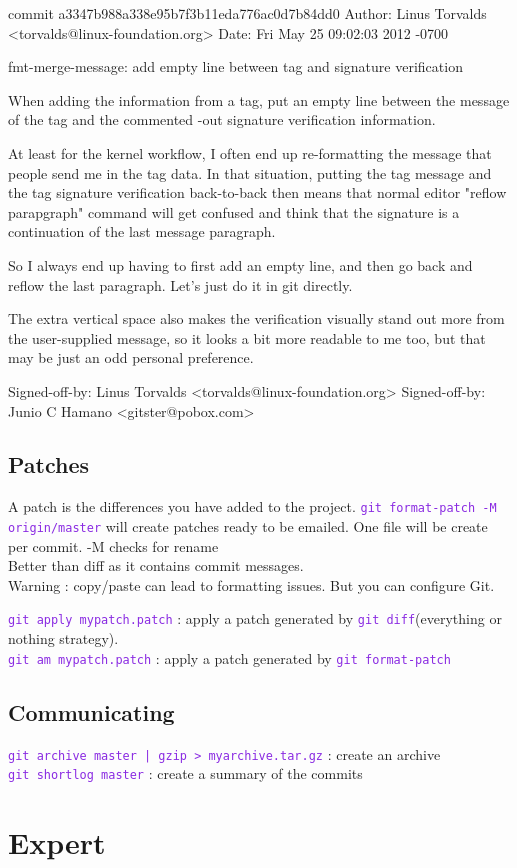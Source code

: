 \documentclass{article}
\def\cmd#1{\texttt{\textcolor{blueviolet}{#1}}}
\begin{document}
\begin{git}
commit a3347b988a338e95b7f3b11eda776ac0d7b84dd0
Author: Linus Torvalds <torvalds@linux-foundation.org>
Date:   Fri May 25 09:02:03 2012 -0700

fmt-merge-message: add empty line between tag and signature verification

When adding the information from a tag, put an empty line between the message of the tag and the commented -out signature verification information.

At least for the kernel workflow, I often end up re-formatting the message that people send me in the tag data. In that situation, putting the tag message and the tag signature verification back-to-back then means that normal editor "reflow parapgraph" command will get confused and think that the signature is a continuation of the last message paragraph.

So I always end up having to first add an empty line, and then go back and reflow the last paragraph. Let's just do it in git directly.

The extra vertical space also makes the verification visually stand out more from the user-supplied message, so it looks a bit more readable to me too, but that may be just an odd personal preference.

Signed-off-by: Linus Torvalds <torvalds@linux-foundation.org>
Signed-off-by: Junio C Hamano <gitster@pobox.com>
\end{git}
\subsection{Patches}
A patch is the differences you have added to the project.
\cmd{git format-patch -M origin/master} will create patches ready to be emailed.
One file will be create per commit. -M checks for rename\\
Better than diff as it contains commit messages.\\
Warning : copy/paste can lead to formatting issues. But you can configure Git.

\cmd{git apply mypatch.patch} : apply a patch generated by \cmd{git
diff}(everything or nothing strategy).\\
\cmd{git am mypatch.patch} : apply a patch generated by \cmd{git format-patch}

\subsection{Communicating}
\cmd{git archive master | gzip > myarchive.tar.gz} : create an archive\\
\cmd{git shortlog master} : create a summary of the commits

\section{Expert}

%
\end{document}
